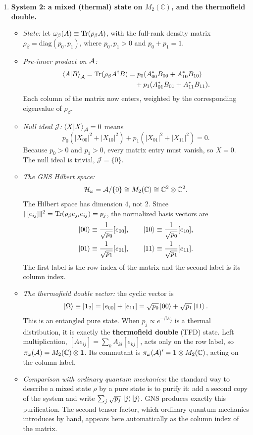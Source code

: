 \begin{workedexamplebox}
\begin{enumerate}[leftmargin=*]
\item \textbf{System 2: a mixed (thermal) state on $M_2(\mathbb{C})$, and the thermofield double.}
\begin{itemize}[leftmargin=*]
\item \emph{State:} let $\omega_\beta(A) \equiv \operatorname{Tr}(\rho_\beta A)$, with the full-rank density matrix
$\rho_\beta = \mathrm{diag}(p_0,p_1)$, where $p_0, p_1 > 0$ and $p_0 + p_1 = 1$.
\item \emph{Pre-inner product on $\mathcal{A}$:}
\begin{align}
\braket{A|B}_{\mathcal{A}} = \operatorname{Tr}(\rho_\beta A^\dagger B)
&= p_0 (A_{00}^* B_{00} + A_{10}^* B_{10}) \notag\\
&\quad + p_1 (A_{01}^* B_{01} + A_{11}^* B_{11}) . \notag
\end{align}
Each column of the matrix now enters, weighted by the corresponding eigenvalue of $\rho_\beta$.
\item \emph{Null ideal $\mathcal{J}$:} $\braket{X|X}_{\mathcal{A}} = 0$ means
\[
p_0 (|X_{00}|^2 + |X_{10}|^2) + p_1 (|X_{01}|^2 + |X_{11}|^2) = 0 .
\]
Because $p_0 > 0$ and $p_1 > 0$, every matrix entry must vanish, so $X = 0$. The null ideal is trivial,
$\mathcal{J} = \{0\}$.
\item \emph{The GNS Hilbert space:}
\[
\mathcal{H}_\omega = \mathcal{A} / \{0\} \cong M_2(\mathbb{C}) \cong \mathbb{C}^2 \otimes \mathbb{C}^2 .
\]
The Hilbert space has dimension $4$, not $2$. Since $\|[e_{ij}]\|^2=\operatorname{Tr}(\rho_\beta e_{ji}e_{ij})=p_j$, the
normalized basis vectors are
\begin{align}
\ket{00} &\equiv \frac{1}{\sqrt{p_0}}[e_{00}], \qquad \ket{10} \equiv \frac{1}{\sqrt{p_0}}[e_{10}], \notag\\
\ket{01} &\equiv \frac{1}{\sqrt{p_1}}[e_{01}], \qquad \ket{11} \equiv \frac{1}{\sqrt{p_1}}[e_{11}] . \notag
\end{align}
The first label is the row index of the matrix and the second label is its column index.
\item \emph{The thermofield double vector:} the cyclic vector is
\[
\ket\Omega \equiv [\mathbf{1}_2] = [e_{00}] + [e_{11}] = \sqrt{p_0}\ket{00} + \sqrt{p_1}\ket{11} .
\]
This is an entangled pure state. When $p_j\propto e^{-\beta E_j}$ is a thermal distribution, it is exactly
the \textbf{thermofield double} (TFD) state. Left multiplication, $[Ae_{ij}]=\sum_kA_{ki}[e_{kj}]$, acts only
on the row label, so $\pi_\omega(\mathcal{A}) = M_2(\mathbb{C}) \otimes \mathbf{1}$. Its commutant is
$\pi_\omega(\mathcal{A})' = \mathbf{1} \otimes M_2(\mathbb{C})$, acting on the column label.
\item \emph{Comparison with ordinary quantum mechanics:} the standard way to describe a mixed state $\rho$ by
a pure state is to purify it: add a second copy of the system and write
$\sum_j\sqrt{p_j}\,\ket j\ket j$. GNS produces exactly this purification. The second tensor factor, which
ordinary quantum mechanics introduces by hand, appears here automatically as the column index of the matrix.
\end{itemize}


\end{enumerate}
\end{workedexamplebox}
